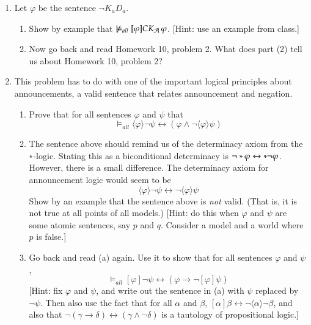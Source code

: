 \documentclass[11pt]{article}
\renewcommand{\phi}{\varphi}
\newcommand{\iif}{\rightarrow}
\newcommand{\iiff}{\leftrightarrow}
\newcommand{\pair}[1]{\langle #1\rangle}
\newcommand{\andd}{\wedge}
\newcommand{\nott}{\neg}
\begin{document}
\begin{enumerate}
\item Let $\phi$ be the sentence $\nott K_a  D_a$.  
\begin{enumerate}
\item Show by example that 
$\not\models_{all} [\phi]CK_{\cal A} \, \phi$.
[Hint: use an example from class.]
\item
Now go back and read Homework 10, problem 2.  What does part (2) tell us about Homework 10, problem 2?
\end{enumerate}

\item  This problem has to do with one of the important logical principles about announcements, 
a valid sentence that relates announcement and negation.
\begin{enumerate}
\item
Prove that for all sentences $\phi$ and $\psi$ that 
\[ \models_{all} \pair{\phi}\nott \psi \iiff (\phi\andd \nott\pair{\phi}\psi) 
\]
\item
The sentence above should remind us of the determinacy axiom from the $*$-logic.
Stating this as a biconditional determinacy is $\nott\sw\phi \iiff \sw\nott\phi$.
However, there is a small difference.   The determinacy axiom for announcement logic would seem to be 
\[  \pair{\phi}\nott \psi \iiff  \nott\pair{\phi}\psi
\]
Show by an example that 
the sentence above is \emph{not} valid.  (That is, it is not true at all points of all models.)
[Hint: do this when $\phi$ and $\psi$ are some atomic sentences, say $p$ and $q$.    Consider a model and a world where $p$ is false.]
\item Go back and read (a) again.  Use it to show that for all sentences $\phi$ and $\psi$,
\[ \models_{all} [\phi]\nott \psi \iiff (\phi\iif \nott[\phi]\psi) 
\]
[Hint: fix $\phi$ and $\psi$, and write out the sentence in (a) with $\psi$ replaced by $\nott\psi$.
Then also use the fact that for all $\alpha$ and $\beta$,  $[\alpha]\beta \iiff \nott \pair{\alpha} \nott \beta$,
and also that $\nott(\gamma\iif \delta) \iiff (\gamma\andd\nott\delta)$ is a tautology of propositional logic.]
\end{enumerate}

\end{enumerate}
\end{document}

